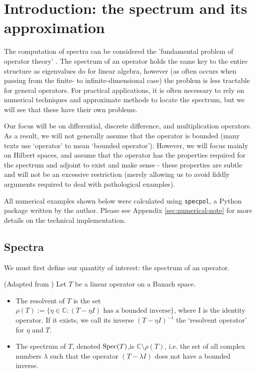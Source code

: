 \documentclass[../main.tex]{subfiles}
\begin{document}
\section{Introduction: the spectrum and its approximation}

The computation of spectra can be considered the 'fundamental problem of
operator theory' \parencite{arveson2002short}. The spectrum of an operator holds
the same key to the entire structure as eigenvalues do for linear algebra,
however (as often occurs when passing from the finite- to infinite-dimensional
case) the problem is less tractable for general operators. For practical
applications, it is often necessary to rely on numerical techniques and
approximate methods to locate the spectrum, but we will see that these have
their own problems.

Our focus will be on differential, discrete difference, and multiplication
operators. As a result, we will not generally assume that the operator is
bounded (many texts use `operator' to mean `bounded operator'). However, we will
focus mainly on Hilbert spaces, and assume that the operator has the properties
required for the spectrum and adjoint to exist and make sense - these properties
are subtle and will not be an excessive restriction (merely allowing us to avoid
fiddly arguments required to deal with pathological examples).

All numerical examples shown below were calculated using \texttt{specpol}, a
Python package written by the author. Please see Appendix
\ref{sec:numerical-note} for more details on the technical implementation.
\subsection{Spectra}

We must first define our quantity of interest: the spectrum of an operator.
\begin{definition}
  (Adapted from \parencite{edmunds2018spectral})
  Let $T$ be a linear operator on a Banach space.
  \begin{itemize}
  \item The resolvent of $T$ is the set 
    $\rho(T) := \{\eta \in \mathbb{C} : (T - \eta I)\text{ has a bounded inverse}\}$,
    where I is the identity
    operator. If it exists, we call its inverse $(T - \eta I)^{-1}$
    the `resolvent operator' for $\eta$ and $T$.
  \item The spectrum of $T$, denoted $\mathrm{Spec}(T)$,is
    $\mathbb{C} \setminus \rho(T)$, i.e. the set of all complex numbers $\lambda$
    such that the operator $(T - \lambda I)$ does not have a bounded inverse.
  \end{itemize}
\end{definition}
\end{document}
